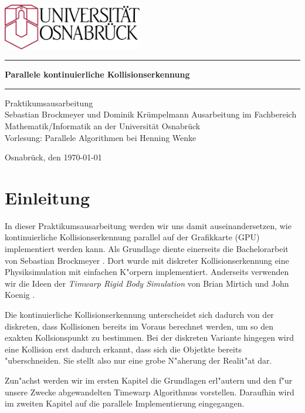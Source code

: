 \documentclass[a4paper, 10pt, openright, parskip, chapterprefix]{scrreprt}
\begin{document}
\begin{titlepage}
\thispagestyle{empty}
\vspace{10mm}
\begin{center}
\includegraphics[height=20mm]{unilogo.eps}
\vfill
\rule{\textwidth}{0.1mm}\vspace{5mm}
\Huge\textbf{Parallele kontinuierliche Kollisionserkennung}
\vspace{1mm}\rule{\textwidth}{0.1mm}
\vfill
\Large
Praktikumsausarbeitung\\
Sebastian Brockmeyer und Dominik Krümpelmann
\vfill
\normalsize
Ausarbeitung  im Fachbereich Mathematik/Informatik an der Universität Osnabrück \\
Vorlesung: Parallele Algorithmen bei Henning Wenke

Osnabrück, den \today
\end{center}
\end{titlepage}

\newpage
\mbox{}
\thispagestyle{empty}
\chapter*{Einleitung}
\setcounter{page}{1}
In dieser Praktikumsausarbeitung werden wir uns damit auseinandersetzen, wie kontinuierliche Kollisionserkennung parallel auf der Grafikkarte (GPU)
implementiert werden kann. Als Grundlage diente einerseits die Bachelorarbeit von Sebastian Brockmeyer \cite{bachelor}. Dort wurde mit diskreter 
Kollisionserkennung eine Physiksimulation mit einfachen K"orpern implementiert. Anderseits verwenden wir die Ideen der \emph{Timwarp Rigid Body Simulation} von Brian Mirtich \cite{timewarp}
und John Koenig \cite{timewarp-cpu}.

Die kontinuierliche Kollisionserkennung unterscheidet sich dadurch von der diskreten, dass Kollisionen bereits im
Voraus berechnet werden, um so den exakten Kollsionspunkt zu bestimmen. Bei der diskreten Variante hingegen wird eine Kollision erst dadurch erkannt,
dass sich die Objetkte bereits "uberschneiden. Sie stellt also nur eine grobe N"aherung der Realit"at dar.

Zun"achst werden wir im ersten Kapitel die Grundlagen erl"autern und den f"ur unsere Zwecke abgewandelten Timewarp Algorithmus vorstellen.
Daraufhin wird im zweiten Kapitel auf die parallele Implementierung eingegangen.
\end{document}
